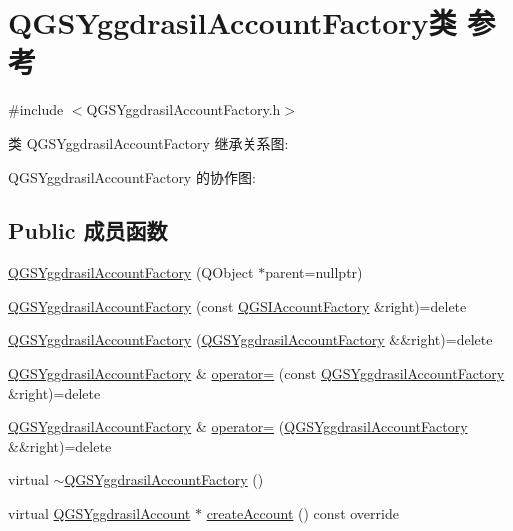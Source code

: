 \hypertarget{class_q_g_s_yggdrasil_account_factory}{}\section{Q\+G\+S\+Yggdrasil\+Account\+Factory类 参考}
\label{class_q_g_s_yggdrasil_account_factory}


{\ttfamily \#include $<$Q\+G\+S\+Yggdrasil\+Account\+Factory.\+h$>$}



类 Q\+G\+S\+Yggdrasil\+Account\+Factory 继承关系图\+:


Q\+G\+S\+Yggdrasil\+Account\+Factory 的协作图\+:
\subsection*{Public 成员函数}
\begin{DoxyCompactItemize}
\item 
\mbox{\hyperlink{class_q_g_s_yggdrasil_account_factory_a0b0726678b67d51fecfc81207543836a}{Q\+G\+S\+Yggdrasil\+Account\+Factory}} (Q\+Object $\ast$parent=nullptr)
\item 
\mbox{\hyperlink{class_q_g_s_yggdrasil_account_factory_a1612496debc9daacb4840962d19ece43}{Q\+G\+S\+Yggdrasil\+Account\+Factory}} (const \mbox{\hyperlink{class_q_g_s_i_account_factory}{Q\+G\+S\+I\+Account\+Factory}} \&right)=delete
\item 
\mbox{\hyperlink{class_q_g_s_yggdrasil_account_factory_a920addf99930814cf0d1478604eb1703}{Q\+G\+S\+Yggdrasil\+Account\+Factory}} (\mbox{\hyperlink{class_q_g_s_yggdrasil_account_factory}{Q\+G\+S\+Yggdrasil\+Account\+Factory}} \&\&right)=delete
\item 
\mbox{\hyperlink{class_q_g_s_yggdrasil_account_factory}{Q\+G\+S\+Yggdrasil\+Account\+Factory}} \& \mbox{\hyperlink{class_q_g_s_yggdrasil_account_factory_a0600f44d1408b403b0726b41f40869d1}{operator=}} (const \mbox{\hyperlink{class_q_g_s_yggdrasil_account_factory}{Q\+G\+S\+Yggdrasil\+Account\+Factory}} \&right)=delete
\item 
\mbox{\hyperlink{class_q_g_s_yggdrasil_account_factory}{Q\+G\+S\+Yggdrasil\+Account\+Factory}} \& \mbox{\hyperlink{class_q_g_s_yggdrasil_account_factory_a768fa9c941363703449e77a5db99be4f}{operator=}} (\mbox{\hyperlink{class_q_g_s_yggdrasil_account_factory}{Q\+G\+S\+Yggdrasil\+Account\+Factory}} \&\&right)=delete
\item 
virtual \mbox{\hyperlink{class_q_g_s_yggdrasil_account_factory_a76d3ac280d56638247d1059e99fd74b9}{$\sim$\+Q\+G\+S\+Yggdrasil\+Account\+Factory}} ()
\item 
virtual \mbox{\hyperlink{class_q_g_s_yggdrasil_account}{Q\+G\+S\+Yggdrasil\+Account}} $\ast$ \mbox{\hyperlink{class_q_g_s_yggdrasil_account_factory_a75499f69e0a7190ccd4551cbea6d935b}{create\+Account}} () const override
\end{DoxyCompactItemize}



